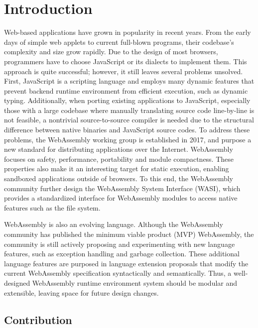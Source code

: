 \chapter{Introduction}

Web-based applications have grown in popularity in recent years. From the early days of simple web applets to current full-blown programs, their codebase's complexity and size grow rapidly. Due to the design of most browsers, programmers have to choose JavaScript or its dialects to implement them. This approach is quite successful; however, it still leaves several problems unsolved. First, JavaScript is a scripting language and employs many dynamic features that prevent backend runtime environment from efficient execution, such as dynamic typing. Additionally, when porting existing applications to JavaScript, especially those with a large codebase where manually translating source code line-by-line is not feasible, a nontrivial source-to-source compiler is needed due to the structural difference between native binaries and JavaScript source codes. To address these problems, the WebAssembly working group is established in 2017, and purpose a new standard for distributing applications over the Internet. WebAssembly focuses on safety, performance, portability and module compactness. These properties also make it an interesting target for static execution, enabling sandboxed applications outside of browsers. To this end, the WebAssembly community further design the WebAssembly System Interface (WASI), which provides a standardized interface for WebAssembly modules to access native features such as the file system.

WebAssembly is also an evolving language. Although the WebAssembly community has published the minimum viable product (MVP) WebAssembly, the community is still actively proposing and experimenting with new language features, such as exception handling and garbage collection. These additional language features are purposed in language extension proposals that modify the current WebAssembly specification syntactically and semantically. Thus, a well-designed WebAssembly runtime environment system should be modular and extensible, leaving space for future design changes.

\section{Contribution}

